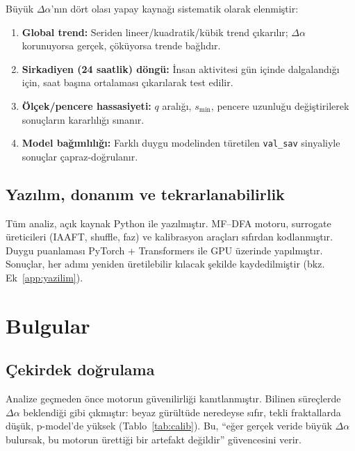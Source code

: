 \documentclass[11pt,a4paper]{article}
\newcommand{\Dal}{\Delta\alpha}
\begin{document}
Büyük $\Dal$'nın dört olası yapay kaynağı sistematik olarak elenmiştir:
\begin{enumerate}[leftmargin=1.6em]
  \item \textbf{Global trend:} Seriden lineer/kuadratik/kübik trend çıkarılır;
        $\Dal$ korunuyorsa gerçek, çöküyorsa trende bağlıdır.
  \item \textbf{Sirkadiyen (24 saatlik) döngü:} İnsan aktivitesi gün içinde
        dalgalandığı için, saat başına ortalaması çıkarılarak test edilir.
  \item \textbf{Ölçek/pencere hassasiyeti:} $q$ aralığı, $s_{\min}$, pencere
        uzunluğu değiştirilerek sonuçların kararlılığı sınanır.
  \item \textbf{Model bağımlılığı:} Farklı duygu modelinden türetilen
        \texttt{val\_sav} sinyaliyle sonuçlar çapraz-doğrulanır.
\end{enumerate}

\subsection{Yazılım, donanım ve tekrarlanabilirlik}

Tüm analiz, açık kaynak Python ile yazılmıştır. MF--DFA motoru, surrogate
üreticileri (IAAFT, shuffle, faz) ve kalibrasyon araçları sıfırdan
kodlanmıştır. Duygu puanlaması PyTorch + Transformers ile GPU üzerinde
yapılmıştır. Sonuçlar, her adımı yeniden üretilebilir kılacak şekilde
kaydedilmiştir (bkz. Ek~\ref{app:yazilim}).

\section{Bulgular}

\subsection{Çekirdek doğrulama}

Analize geçmeden önce motorun güvenilirliği kanıtlanmıştır. Bilinen süreçlerde
$\Dal$ beklendiği gibi çıkmıştır: beyaz gürültüde neredeyse sıfır, tekli
fraktallarda düşük, p-model'de yüksek (Tablo~\ref{tab:calib}). Bu, ``eğer
gerçek veride büyük $\Dal$ bulursak, bu motorun ürettiği bir artefakt
değildir'' güvencesini verir.
\end{document}
